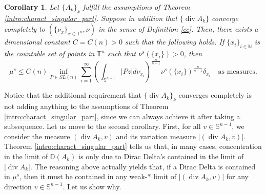 \documentclass[10pt,reqno]{amsart}
\numberwithin{equation}{section}
\newcommand{\T}{\mathbb{T}}
\newcommand{\N}{\mathbb{N}}
\newcommand{\D}{\mathbb{D}}
\DeclareMathOperator{\dv}{div}
\theoremstyle{plain}
\newtheorem{Cor}[Teo]{Corollary}
\theoremstyle{definition}
\theoremstyle{remark}
\begin{document}
\begin{Cor}\label{cor1}
Let $\{A_k\}_k$ fulfill the assumptions of Theorem \ref{intro:charact_singular_part}. Suppose in addition that $\{\dv A_k\}$ converge completely to $(\{\nu_x\}_{x \in \T^n},\nu)$ in the sense of Definition \ref{cc}. Then, there exists a dimensional constant $C= C(n) > 0$ such that the following holds. If $\{x_i\}_{i\in \N}$ is the countable set  of points in $\T^n$ such that $\nu^s(\{x_i\}) > 0$, then
\[
\mu^s\leq C(n) \inf_{P \in SL(n)}\sum_{i=1}^\infty \left(\int_{\mathbb{S}^{n-1}}|Pz|d\nu_{x_i}\right)^\frac{n}{n - 1}\nu^s(\{x_i\})^\frac{n}{n-1}\delta_{x_i}\quad \text{as measures}.
\]
\end{Cor}

Notice that the additional requirement that $\{\dv A_k\}_k$ converges completely is not adding anything to the assumptions of Theorem \ref{intro:charact_singular_part}, since we can always achieve it after taking a subsequence. Let us move to the second corollary. First, for all $v \in \mathbb{S}^{n-1}$, we consider the measure $(\dv A_k,v)$ and its variation measure $|(\dv A_k,v)|$. Theorem \ref{intro:charact_singular_part} tells us that, in many cases, concentration in the limit of $\D(A_k)$ is only due to Dirac Delta's contained in the limit of $|\dv A_k|$. The reasoning above actually yields that, if a Dirac Delta is contained in $\mu^s$, then it must be contained in any weak-$*$ limit of $|(\dv A_k,v)|$ for any direction $v \in \mathbb S^{n-1}$. Let us show why.
\end{document}
